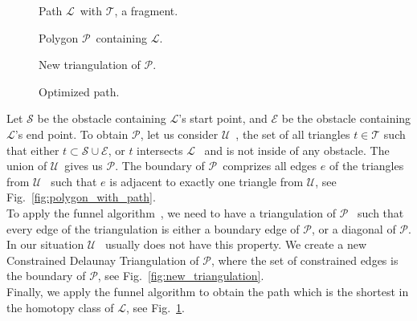 \documentclass{gd-llncs}
\newcommand{\cdt}{$\mathcal{T}$}
\newcommand{\unpath}{$\mathcal{L}$}
\newcommand{\triset}{$\mathcal{U}$}
\newcommand{\plg}{$\mathcal{P}$}
\begin{document}
{\begin{figure}[!tbp]
  \centering
  \begin{minipage}[b]{0.45\textwidth}
    
    \caption{Path \unpath~with \cdt, a fragment.}
    \label{fig:non_opt_path_L}
  \end{minipage}
  \hfill
  \begin{minipage}[b]{0.45\textwidth}
    
    \caption{Polygon \plg~containing \unpath.}
    \label{fig:polygon_with_path}
  \end{minipage}
  \vfill
  \begin{minipage}[b]{0.45\textwidth}
    
    \caption{New triangulation of \plg.}
    \label{fig:new_triangulation}
  \end{minipage}
  \hfill
  \begin{minipage}[b]{0.45\textwidth}
    
    \caption{Optimized path.}
    \label{fig:optimized_path}
  \end{minipage}
\end{figure}
Let $\mathcal{S}$ be the obstacle containing \unpath's start point, and $\mathcal{E}$ be the obstacle containing \unpath's end point.
To obtain \plg, let us consider \triset~, the set of all triangles ${t} \in \mathcal{T}$ such that
either ${t} \subset \mathcal{S} \cup \mathcal{E}$, or $t$ intersects \unpath~ and is not inside of any obstacle.
The union of \triset~gives us \plg. The boundary of \plg~comprizes all edges $e$ of the triangles from \triset~ such that $e$ is adjacent to exactly one triangle from \triset, see Fig.~\ref{fig:polygon_with_path}. \\
To apply the funnel algorithm~\cite{chazelle1982theorem,hershberger1994computing}, we need to have a triangulation of \plg~ such that every edge of the triangulation is either a boundary edge of \plg, or a diagonal of \plg. In our situation \triset~ usually does not have this property. We create a new Constrained Delaunay Triangulation of \plg, where the set of constrained edges is the boundary of \plg, see Fig.~\ref{fig:new_triangulation}.\\
Finally, we apply the funnel algorithm to obtain the path which is the shortest in the homotopy class of \unpath, see Fig.~\ref{fig:optimized_path}.\\

}
\end{document}
